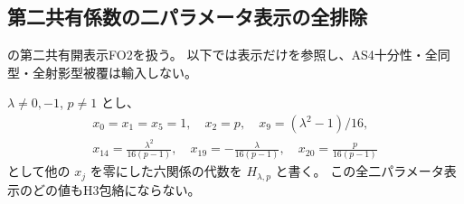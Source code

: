 \subsection{第二共有係数の二パラメータ表示の全排除}
\label{subsec:cubic-as4-second-shared}
\cite{AS4lowpinned}の第二共有開表示FO2を扱う。
以下では表示だけを参照し、AS4十分性・全同型・全射影型被覆は輸入しない。

\begin{proposition}\label{prop:cubic-second-shared-H}
$\lambda\ne0,-1$, $p\ne1$ とし、
\[
\begin{gathered}
 x_0=x_1=x_5=1,\quad x_2=p,\quad x_9=(\lambda^2-1)/16,\\
 x_{14}=\frac{\lambda^2}{16(p-1)},\quad
 x_{19}=-\frac{\lambda}{16(p-1)},\quad
 x_{20}=\frac p{16(p-1)}
\end{gathered}
\]
として他の $x_j$ を零にした六関係の代数を $H_{\lambda,p}$ と書く。
この全二パラメータ表示のどの値もH3包絡にならない。
\end{proposition}
